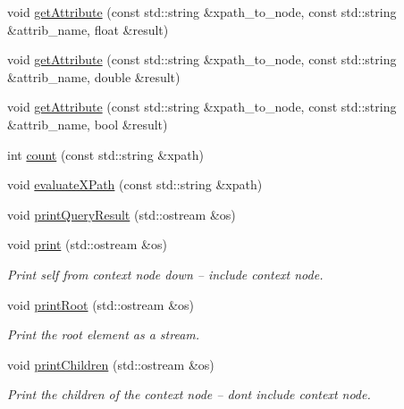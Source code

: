 \begin{DoxyCompactItemize}
\item 
void \mbox{\hyperlink{classXMLXPathReader_1_1BasicXPathReader_a5bcbca6d3898a73559f18cde152be0a4}{get\+Attribute}} (const std\+::string \&xpath\+\_\+to\+\_\+node, const std\+::string \&attrib\+\_\+name, float \&result)
\item 
void \mbox{\hyperlink{classXMLXPathReader_1_1BasicXPathReader_a4278ca0d297a82127b737339de448424}{get\+Attribute}} (const std\+::string \&xpath\+\_\+to\+\_\+node, const std\+::string \&attrib\+\_\+name, double \&result)
\item 
void \mbox{\hyperlink{classXMLXPathReader_1_1BasicXPathReader_a3732bdb3a62ba9fa759b65b56633997f}{get\+Attribute}} (const std\+::string \&xpath\+\_\+to\+\_\+node, const std\+::string \&attrib\+\_\+name, bool \&result)
\item 
int \mbox{\hyperlink{classXMLXPathReader_1_1BasicXPathReader_a2ae482dc6df0839bcfb96dc3539e4ce4}{count}} (const std\+::string \&xpath)
\item 
void \mbox{\hyperlink{classXMLXPathReader_1_1BasicXPathReader_a4aaa7102c9f6a8d5ca3adc574f06ce8b}{evaluate\+X\+Path}} (const std\+::string \&xpath)
\item 
void \mbox{\hyperlink{classXMLXPathReader_1_1BasicXPathReader_a719ba9bbd4ae77d6be9a6544a2d0ccaf}{print\+Query\+Result}} (std\+::ostream \&os)
\item 
void \mbox{\hyperlink{classXMLXPathReader_1_1BasicXPathReader_a846e0ac9b2835040cb615a9585e2a999}{print}} (std\+::ostream \&os)
\begin{DoxyCompactList}\small\item\em Print self from context node down -- include context node. \end{DoxyCompactList}\item 
void \mbox{\hyperlink{classXMLXPathReader_1_1BasicXPathReader_abc0bfad898a5b01d2251d7aaacbbb507}{print\+Root}} (std\+::ostream \&os)
\begin{DoxyCompactList}\small\item\em Print the root element as a stream. \end{DoxyCompactList}\item 
void \mbox{\hyperlink{classXMLXPathReader_1_1BasicXPathReader_a980f4e08d97855479d47e5b10205075e}{print\+Children}} (std\+::ostream \&os)
\begin{DoxyCompactList}\small\item\em Print the children of the context node -- dont include context node. \end{DoxyCompactList}\item 

\end{DoxyCompactItemize}
